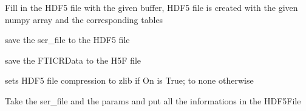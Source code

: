 \documentclass[letterpaper,10pt,openany,oneside]{sphinxmanual}
\begin{document}
\begin{fulllineitems}
\begin{fulllineitems}
\end{fulllineitems}


\begin{fulllineitems}
\label{rst/code:File.HDF5File.HDF5File.position_array}
Fill in the HDF5 file with the given buffer, HDF5 file is created with the given numpy array and the corresponding tables

\end{fulllineitems}


\begin{fulllineitems}
\label{rst/code:File.HDF5File.HDF5File.save}
save the ser\_file to the HDF5 file

\end{fulllineitems}


\begin{fulllineitems}
\label{rst/code:File.HDF5File.HDF5File.save_fticrd}
save the FTICRData to the H5F file

\end{fulllineitems}


\begin{fulllineitems}
\label{rst/code:File.HDF5File.HDF5File.set_compression}
sets HDF5 file compression to zlib if On is True; to none otherwise

\end{fulllineitems}


\begin{fulllineitems}
\label{rst/code:File.HDF5File.HDF5File.set_data}
Take the ser\_file and the params and put all the informations in the HDF5File

\end{fulllineitems}


\end{fulllineitems}
\end{document}
